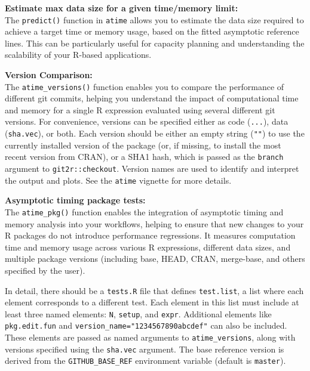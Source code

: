 \textbf{Estimate max data size for a given time/memory limit:} \\
The \texttt{predict()} function in \texttt{atime} allows you to estimate the data size required to achieve a target time or memory usage, based on the fitted asymptotic reference lines. This can be particularly useful for capacity planning and understanding the scalability of your R-based applications.
\vspace{0.1in}

\textbf{Version Comparison:} \\
The \texttt{atime\_versions()} function enables you to compare the performance of different git commits, helping you understand the impact of computational time and memory for a single R expression evaluated using several different git versions.
For convenience, versions can be specified either as code (\texttt{...}), data (\texttt{sha.vec}), or both. Each version should be either an empty string (\texttt{""}) to use the currently installed version of the package (or, if missing, to install the most recent version from CRAN), or a SHA1 hash, which is passed as the \texttt{branch} argument to \texttt{git2r::checkout}. Version names are used to identify and interpret the output and plots. See the \texttt{atime} vignette for more details.

\vspace{0.1in}

\textbf{Asymptotic timing package tests:} \\

The \texttt{atime\_pkg()} function enables the integration of asymptotic timing and memory analysis into your workflows, helping to ensure that new changes to your R packages do not introduce performance regressions. It measures computation time and memory usage across various R expressions, different data sizes, and multiple package versions (including base, HEAD, CRAN, merge-base, and others specified by the user).

In detail, there should be a \texttt{tests.R} file that defines \texttt{test.list}, a list where each element corresponds to a different test. Each element in this list must include at least three named elements: \texttt{N}, \texttt{setup}, and \texttt{expr}. Additional elements like \texttt{pkg.edit.fun} and \texttt{version\_name="1234567890abcdef"} can also be included. These elements are passed as named arguments to \texttt{atime\_versions}, along with versions specified using the \texttt{sha.vec} argument. The base reference version is derived from the \texttt{GITHUB\_BASE\_REF} environment variable (default is \texttt{master}).


